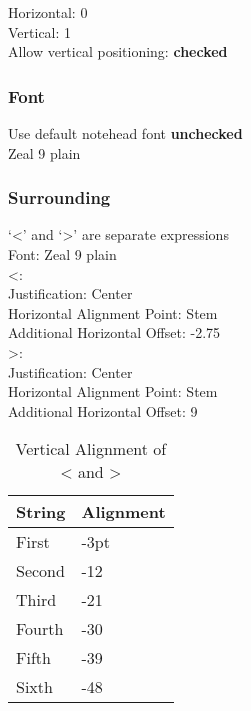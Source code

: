 \documentclass[10pt,twoside]{article} %
\begin{document}
Horizontal: 0\\
Vertical: 1\\
Allow vertical positioning: \textbf{checked}

\subsubsection{Font}
\label{sec:font}

Use default notehead font \textbf{unchecked}\\
Zeal 9 plain

\subsubsection{Surrounding}
\label{sec:surrounding}

`<' and `>' are separate expressions\\
Font: Zeal 9 plain\\

<:\\
\indent Justification: Center\\
\indent Horizontal Alignment Point: Stem\\
\indent Additional Horizontal Offset: -2.75\\

>:\\
\indent Justification: Center\\
\indent Horizontal Alignment Point: Stem\\
\indent Additional Horizontal Offset: 9\\

\begin{table}[h!]
  \centering
  \begin{tabular}{l l}
    String & Alignment\\\hline
    First & -3pt\\
    Second & -12\\
    Third & -21\\
    Fourth & -30\\
    Fifth & -39\\
    Sixth & -48\\
  \end{tabular}
  \caption{Vertical Alignment of < and >}
\end{table}
\end{document}
